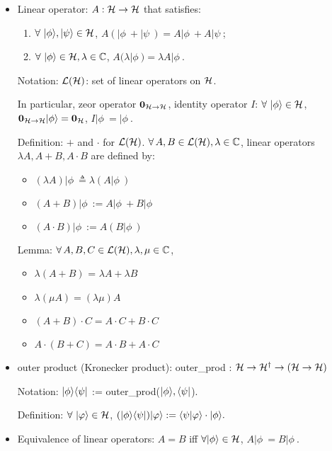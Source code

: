 \begin{itemize}
    \item Linear operator: $A:{\mathcal{H}}\rightarrow{\mathcal{H}}$ that satisfies:
    \begin{enumerate}
        \item $\forall\ |\phi\>,|\psi\>\in\cH$, $A(|\phi\>+|\psi\>) = A|\phi\>+A|\psi\>$;
        \item $\forall\ |\phi\rangle\in{\mathcal{H}}, \lambda\in{\mathbb{C}}$, $A(\lambda|\phi\>) = \lambda A|\phi\>$.
    \end{enumerate}
    
    Notation: ${\mathcal{L}}({\mathcal{H}})$: set of linear operators on ${\mathcal{H}}$.
    
    In particular, zeor operator ${\mathbf{0}_{{\mathcal{H}}\rightarrow{\mathcal{H}}}}$, identity operator $I$: $\forall\ |\phi\rangle\in{\mathcal{H}}$, ${\mathbf{0}_{{\mathcal{H}}\rightarrow{\mathcal{H}}}}|\phi\rangle = {\mathbf{0}_{{\mathcal{H}}}}$, $I|\phi\> = |\phi\>$.
    
    Definition: $+$ and $\cdot$ for ${\mathcal{L}}({\mathcal{H}})$. $\forall\,A,B\in{\mathcal{L}}({\mathcal{H}}),\lambda\in{\mathbb{C}}$, linear operators $\lambda A, A+B,A\cdot B$ are defined by:
    \begin{itemize}
        \item $(\lambda A)|\phi\> \triangleq \lambda (A|\phi\>)$
        \item $(A+B)|\phi\> := A|\phi\>+B|\phi\>$
        \item $(A\cdot B)|\phi\> := A(B|\phi\>)$
    \end{itemize}
    Lemma: $\forall\,A,B,C\in{\mathcal{L}}({\mathcal{H}}),\lambda,\mu\in{\mathbb{C}}$,
    \begin{itemize}
        \item $\lambda(A+B)$ = $\lambda A + \lambda B$
        \item $\lambda(\mu A) = (\lambda \mu)A$
        \item $(A+B)\cdot C = A\cdot C + B\cdot C$
        \item $A\cdot (B+C) = A\cdot B + A\cdot C$
    \end{itemize}
    
    \item outer product (Kronecker product): outer\_prod : ${\mathcal{H}}\rightarrow{\mathcal{H}}^\dag\rightarrow({\mathcal{H}}\rightarrow{\mathcal{H}})$
    
    Notation: $|\phi\rangle\langle\psi|$ := outer\_prod($|\phi\rangle,\langle\psi|$).
    
    Definition: $\forall\ |\varphi\>\in\cH$, $(|\phi\rangle\langle\psi|)|\varphi\rangle := \langle\psi|\varphi\rangle\cdot |\phi\rangle.$
    
    \item Equivalence of linear operators: $A = B$ iff $\forall |\phi\rangle\in{\mathcal{H}}$, $A|\phi\> = B|\phi\>$. 
    

\end{itemize}
